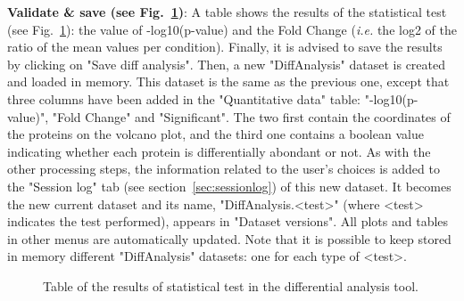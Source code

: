 \documentclass[12pt]{article}
\begin{document}
\textbf{Validate \& save (see Fig.~\ref{fig:anadiff4})}: 
A table shows the results of the statistical test (see 
Fig.~\ref{fig:anadiff4}): the value of -log10(p-value) and the Fold Change 
(\emph{i.e.} the log2 of the ratio of the mean values per condition). Finally, 
it is advised to save the results by clicking on "Save diff analysis". Then, 
a new "DiffAnalysis" dataset is created and loaded in memory. This dataset 
is the same as the previous one, except that three columns have been added in 
the "Quantitative data" table: "-log10(p-value)",  "Fold Change" and 
"Significant". The two first contain the coordinates of the proteins on the 
volcano plot, and the third one contains a boolean value indicating whether 
each protein is differentially abondant or not. As with the other processing 
steps, the information related to the user's choices is added to the 
"Session log" tab (see section~\ref{sec:sessionlog}) of this new dataset.
It becomes the new current dataset and its name, "DiffAnalysis.<test>" (where 
<test> indicates the test performed), appears in "Dataset versions". All 
plots and tables in other menus are automatically updated. Note that it is 
possible to keep stored in memory different "DiffAnalysis" datasets: one for 
each type of <test>.


\begin{figure}
\centering
{}
\caption{Table of the results of statistical test in the differential 
analysis tool.}\label{fig:anadiff4}
\end{figure}
\end{document}
